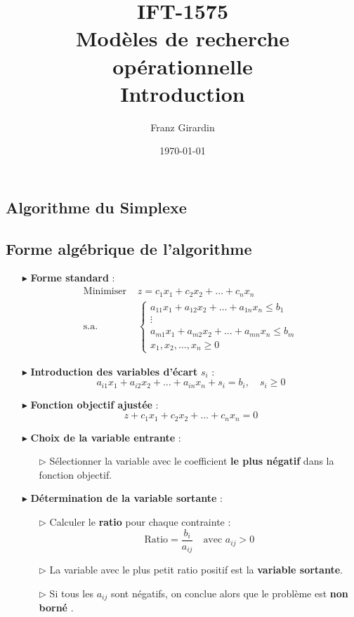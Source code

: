 \documentclass{report}
\title{\huge{IFT-1575}\\\Huge{Modèles de recherche opérationnelle}\\\vspace{2em} Introduction}
\author{\huge{Franz Girardin}}
\date{\today}
\begin{document}
\begin{multicols*}{2}
\chapter{Algorithme du Simplexe}
\section{Forme algébrique de l'algorithme}
\begin{itemize}
    \item[$\blacktriangleright$] \textbf{Forme standard} :
    \begin{align*}
        \text{Minimiser } & z = c_1x_1 + c_2x_2 + \dots + c_nx_n \\
        \text{s.a. } &
        \begin{cases}
            a_{11}x_1 + a_{12}x_2 + \dots + a_{1n}x_n \leq b_1 \\
            \vdots \\
            a_{m1}x_1 + a_{m2}x_2 + \dots + a_{mn}x_n \leq b_m \\
            x_1, x_2, \dots, x_n \geq 0
        \end{cases}
    \end{align*}

    \item[$\blacktriangleright$] \textbf{Introduction des variables d'écart} $s_i$ :
    \[
    a_{i1}x_1 + a_{i2}x_2 + \dots + a_{in}x_n + s_i = b_i, \quad s_i \geq 0
    \]

    \item[$\blacktriangleright$] \textbf{Fonction objectif ajustée} :
    \[
    z + c_1x_1 + c_2x_2 + \dots + c_nx_n = 0
    \]

    \item[$\blacktriangleright$] \textbf{Choix de la variable entrante} :
    \begin{itemize}
        \item[$\rhd$] Sélectionner la variable avec le coefficient \textbf{le plus négatif} dans la fonction objectif.
    \end{itemize}

    \item[$\blacktriangleright$] \textbf{Détermination de la variable sortante} :
    \begin{itemize}
        \item[$\rhd$] Calculer le \textbf{ratio} pour chaque contrainte :
        \[
        \boxed{\text{Ratio} = \dfrac{b_i}{a_{ij}}} \quad \text{avec } a_{ij} > 0
        \]
        \item[$\rhd$] La variable avec le plus petit ratio positif est la \textbf{variable sortante}.
        \item[$\rhd$] Si tous les $a_{ij}$ sont négatifs, on conclue 
            alors que le problème est \textbf{non borné}                        .
    \end{itemize}


\end{itemize}
\end{multicols*}
\end{document}

